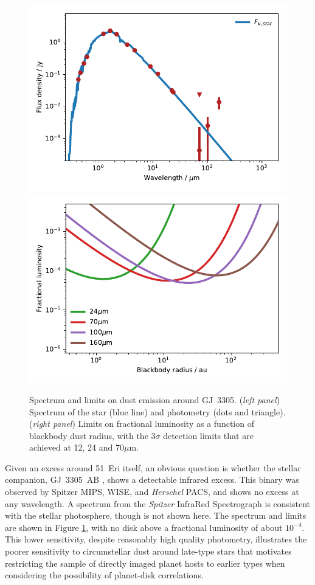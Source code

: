 \documentclass[a4paper,fleqn,usenatbib]{mnras}
\begin{document}
\begin{figure}
  \includegraphics[width=\columnwidth]{sed_gj3305.pdf}
  \includegraphics[width=\columnwidth]{f_r_gj3305.pdf}
  \caption{Spectrum and limits on dust emission around
    GJ~3305. (\emph{left panel}) Spectrum of the star (blue line) and
    photometry (dots and triangle). (\emph{right panel}) Limits on
    fractional luminosity as a function of blackbody dust radius, with
    the 3$\sigma$ detection limits that are achieved at 12, 24 and
    70$\mu$m.}
    \label{fig:gj3305}
\end{figure}

Given an excess around 51~Eri itself, an obvious question is whether the
stellar companion, GJ~3305~AB
\citep{2001ApJ...562L..87Z,2006AJ....131.1730F}, shows a detectable
infrared excess. This binary was observed by Spitzer MIPS, WISE, and
\emph{Herschel} PACS, and shows no excess at any wavelength. A spectrum
from the \emph{Spitzer} InfraRed Spectrograph
\citep[IRS,][]{2004ApJS..154...18H,2011ApJS..196....8L} is consistent
with the stellar photosphere, though is not shown here. The spectrum and
limits are shown in Figure \ref{fig:gj3305}, with no disk above a
fractional luminosity of about $10^{-4}$. This lower sensitivity,
despite reasonably high quality photometry, illustrates the poorer
sensitivity to circumstellar dust around late-type stars that motivates
restricting the sample of directly imaged planet hosts to earlier types
when considering the possibility of planet-disk correlations.
\end{document}
